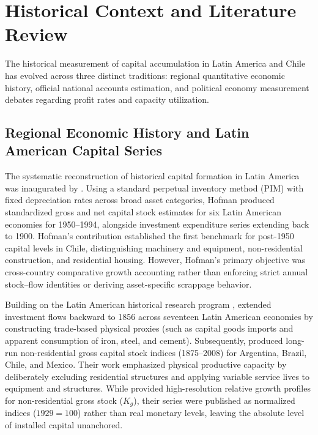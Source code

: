 \section{Historical Context and Literature Review}\label{sec:literature}

The historical measurement of capital accumulation in Latin America and Chile has evolved across three distinct traditions: regional quantitative economic history, official national accounts estimation, and political economy measurement debates regarding profit rates and capacity utilization.

\subsection{Regional Economic History and Latin American Capital Series}
The systematic reconstruction of historical capital formation in Latin America was inaugurated by \citet{Hofman2000a, Hofman2000b}. Using a standard perpetual inventory method (PIM) with fixed depreciation rates across broad asset categories, Hofman produced standardized gross and net capital stock estimates for six Latin American economies for 1950--1994, alongside investment expenditure series extending back to 1900. Hofman's contribution established the first benchmark for post-1950 capital levels in Chile, distinguishing machinery and equipment, non-residential construction, and residential housing. However, Hofman's primary objective was cross-country comparative growth accounting rather than enforcing strict annual stock--flow identities or deriving asset-specific scrappage behavior.

Building on the Latin American historical research program \citep{Carreras2006}, \citet{Tafunell2013} extended investment flows backward to 1856 across seventeen Latin American economies by constructing trade-based physical proxies (such as capital goods imports and apparent consumption of iron, steel, and cement). Subsequently, \citet{TafunellDucoing2016} produced long-run non-residential gross capital stock indices (1875--2008) for Argentina, Brazil, Chile, and Mexico. Their work emphasized physical productive capacity by deliberately excluding residential structures and applying variable service lives to equipment and structures. While \citet{TafunellDucoing2016} provided high-resolution relative growth profiles for non-residential gross stock ($K_g$), their series were published as normalized indices ($1929=100$) rather than real monetary levels, leaving the absolute level of installed capital unanchored.

